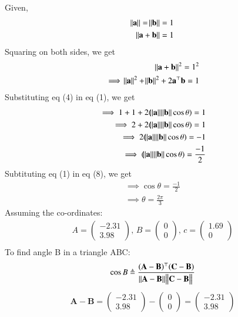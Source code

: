 \documentclass[12pt,-letter paper]{article}
\let\vec\mathbf{}
\let\vec\mathbf{}
\let\vec\mathbf{}
\newcommand{\myvec}[1]{\ensuremath{\begin{pmatrix}#1\end{pmatrix}}}
\begin{document}
\begin{enumerate}
Given,
\begin{align}
	\norm{\vec{a}} = \norm{\vec{b}}=1\\
	\norm{\vec{a}+\vec{b}}=1
\end{align}
Squaring on both sides, we get
\begin{align}
	\norm{\vec{a}+\vec{b}}^2=1^2
\\	
	\implies \norm{\vec{a}}^2 + \norm{\vec{b}}^2 + 2\vec{a}^{\top}\vec{b} = 1
\end{align}
Substituting eq (4) in eq (1), we get
\\
\begin{align}
	\implies 1+1+2(\norm{\vec{a}}\norm{\vec{b}}\cos{\theta})=1
	\\
	\implies 2+2(\norm{\vec{a}}\norm{\vec{b}}\cos{\theta})=1
        \\
	\implies 2(\norm{\vec{a}}\norm{\vec{b}}\cos{\theta})=-1
	\\
	\implies (\norm{\vec{a}}\norm{\vec{b}}\cos{\theta})=\frac{-1}{2}\label{eq:12/10/5/17/4}
\end{align}
Subtituting eq (1) in eq (8), we get
\begin{align}
	\implies \cos{\theta}=\frac{-1}{2}
	\\
	\implies \theta=\frac{2\pi}{3}
\end{align}
Assuming the co-ordinates:\\
  \begin{align}
{A}=\myvec{-2.31 \\ 3.98},\,
{B}=\myvec{0\\0},\,
{c}=\myvec{1.69\\0}\\
  \end{align}
To find angle B in a triangle ABC:\\
  \begin{align}
\cos{B} \triangleq \frac{(\vec{A}-\vec{B})^\top(\vec{C}-\vec{B})}{\norm{\vec{A}-\vec{B}}\norm{\vec{C}-\vec{B}}}\\
  \end{align}
  \begin{align} 
\vec{A} - \vec{B} = \myvec{-2.31 \\ 3.98}-\myvec{0 \\ 0} = \myvec{ -2.31\\ 3.98 }
 \end{align}


\end{enumerate}
\end{document}
